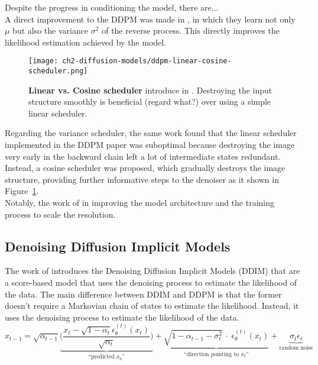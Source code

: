 Despite the progress in conditioning the model, there are...\\

A direct improvement to the DDPM was made in \cite{nichol2021improved}, in which they learn not only $\mu$ but also the variance $\sigma^{2}$ of the reverse process. This directly improves the likelihood estimation achieved by the model. \\

\begin{figure}[ht]
    \centering
    \texttt{[image: ch2-diffusion-models/ddpm-linear-cosine-scheduler.png]}
    \captionsetup{width=\textwidth} %
    \caption{\textbf{Linear vs. Cosine scheduler} introduce in \cite{nichol2021improved}. Destroying the input structure smoothly is beneficial (regard what?) over using a simple linear scheduler.}
    \label{fig:ddpm-linear-vs-cosine-scheduler}
  \end{figure}

Regarding the variance scheduler, the same work found that the linear scheduler implemented in the DDPM paper was suboptimal because destroying the image very early in the backward chain left a lot of intermediate states redundant. Instead, a cosine scheduler was proposed, which gradually destroys the image structure, providing further informative steps to the denoiser as it shown in Figure~\ref{fig:ddpm-linear-vs-cosine-scheduler}. \\

Notably, the work of \cite{rombach2022highresolution} in improving the model architecture and the training process to scale the resolution.

\subsection{Denoising Diffusion Implicit Models}

The work of \cite{song2020denoising} introduces the Denoising Diffusion Implicit Models (DDIM) that are a score-based model that uses the denoising process to estimate the likelihood of the data. The main difference between DDIM and DDPM is that the former doesn't require a Markovian chain of states to estimate the likelihood. Instead, it uses the denoising process to estimate the likelihood of the data.\\

\begin{equation}\label{eqn:ddim-likelihood}
    x_{t-1} = 
    \sqrt{\alpha_{t-1}}\underbrace{\bigg(\frac{x_{t}-\sqrt{1-\alpha_{t}}\epsilon_{\theta}^{(t)}(x_{t})}{\sqrt{\alpha_{t}}}\bigg)}_{\text{``predicted $x_{0}$''}} 
    + \underbrace{\sqrt{1-\alpha_{t-1} - \sigma^2_{t}}~\cdot~\epsilon_{\theta}^{(t)}(x_{t})}_{\text{``direction pointing to $x_{t}$''}}
    + \underbrace{\sigma_{t}\epsilon_{t}}_{\text{random noise}}
\end{equation}

